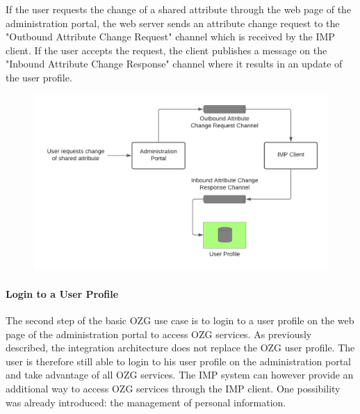 \documentclass[
     12pt,         %
     a4paper,      %
     BCOR=10mm,version=first,     %
     DIV=14,version=first,        %
     ]{scrreprt}
\begin{document}
If the user requests the change of a shared attribute through the web page of the administration portal, the web server sends an attribute change request to the "Outbound Attribute Change Request" channel which is received by the IMP client. If the user accepts the request, the client publishes a message on the "Inbound Attribute Change Response" channel where it results in an update of the user profile.

\begin{figure}[h]
    \centering
    \includegraphics[scale=0.3]{Diagrams/Integration Architecture 1/Overview/Attribute Change Web Page.png}
\end{figure}

\paragraph{Login to a User Profile}

The second step of the basic OZG use case is to login to a user profile on the web page of the administration portal to access OZG services. As previously described, the integration architecture does not replace the OZG user profile. The user is therefore still able to login to his user profile on the administration portal and take advantage of all OZG services. The IMP system can however provide an additional way to access OZG services through the IMP client. One possibility was already introduced: the management of personal information.
\end{document}
